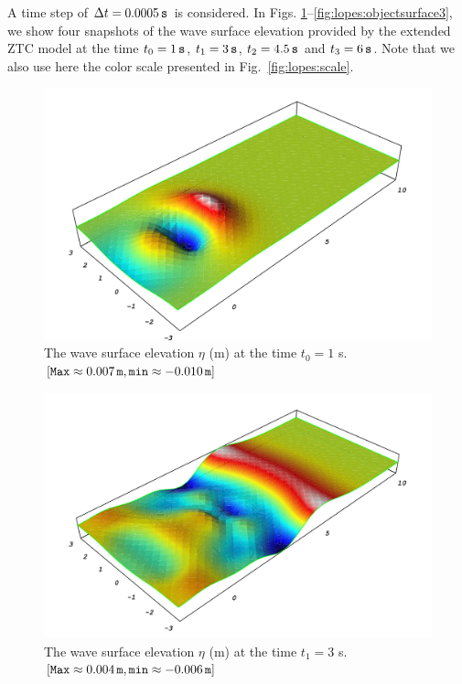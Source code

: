 A time step of $\Delta t=0.0005\, {\tt s}$ is considered.  In
Figs. \ref{fig:lopes:objectsurface0}--\ref{fig:lopes:objectsurface3},
we show four snapshots of the wave surface elevation
provided by the extended ZTC model at the time $t_0=1\, {\tt s}$, $t_1=3\, {\tt s}$,
$t_2=4.5\, {\tt s}$ and $t_3=6\, {\tt s}$.
Note that we also use here the color scale presented in Fig.~\ref{fig:lopes:scale}.
\begin{figure}
\begin{center}
\includegraphics[width=\largefig]{chapters/lopes/pdf/eta1.pdf}
\caption{The  wave surface elevation $\eta$ (m) at the time
  $t_0=1$ s. $[{\tt Max}\approx 0.007\, {\tt m},
    {\tt min}\approx-0.010\,{\tt m}]$}
\label{fig:lopes:objectsurface0}
\end{center}
\end{figure}
\begin{figure}
\begin{center}
\includegraphics[width=\largefig]{chapters/lopes/pdf/eta3.pdf}
\caption{The  wave surface elevation $\eta$ (m) at the time
  $t_1=3$ s. $[{\tt Max}\approx 0.004\, {\tt m},
    {\tt min}\approx -0.006\, {\tt m}]$}
\label{fig:lopes:objectsurface1}
\end{center}
\end{figure}
